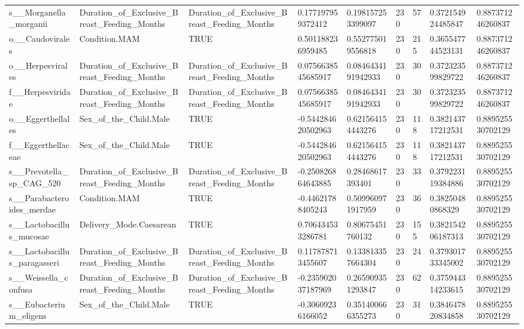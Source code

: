 \begin{longtable}{lllllllll}
s\_\_Morganella\_morganii & Duration\_of\_Exclusive\_Breast\_Feeding\_Months & Duration\_of\_Exclusive\_Breast\_Feeding\_Months & 0.177197959372412 & 0.198157253399097 & 230 & 57 & 0.372154924485847 & 0.887371246260837 \\
o\_\_Caudovirales & Condition.MAM & TRUE & 0.501188236959485 & 0.552775019556818 & 230 & 215 & 0.365547744523131 & 0.887371246260837 \\
o\_\_Herpesvirales & Duration\_of\_Exclusive\_Breast\_Feeding\_Months & Duration\_of\_Exclusive\_Breast\_Feeding\_Months & 0.0756638545685917 & 0.0846434191942933 & 230 & 30 & 0.372323599829722 & 0.887371246260837 \\
f\_\_Herpesviridae & Duration\_of\_Exclusive\_Breast\_Feeding\_Months & Duration\_of\_Exclusive\_Breast\_Feeding\_Months & 0.0756638545685917 & 0.0846434191942933 & 230 & 30 & 0.372323599829722 & 0.887371246260837 \\
o\_\_Eggerthellales & Sex\_of\_the\_Child.Male & TRUE & -0.544284620502963 & 0.621564154443276 & 230 & 118 & 0.382143717212531 & 0.889525530702129 \\
f\_\_Eggerthellaceae & Sex\_of\_the\_Child.Male & TRUE & -0.544284620502963 & 0.621564154443276 & 230 & 118 & 0.382143717212531 & 0.889525530702129 \\
s\_\_Prevotella\_sp\_CAG\_520 & Duration\_of\_Exclusive\_Breast\_Feeding\_Months & Duration\_of\_Exclusive\_Breast\_Feeding\_Months & -0.250826864643885 & 0.28468617393401 & 230 & 33 & 0.379223119384886 & 0.889525530702129 \\
s\_\_Parabacteroides\_merdae & Condition.MAM & TRUE & -0.44621788405243 & 0.509960971917959 & 230 & 36 & 0.38250480868329 & 0.889525530702129 \\
s\_\_Lactobacillus\_mucosae & Delivery\_Mode.Caesarean & TRUE & 0.706434533286781 & 0.80675451760132 & 230 & 155 & 0.382154206187313 & 0.889525530702129 \\
s\_\_Lactobacillus\_paragasseri & Duration\_of\_Exclusive\_Breast\_Feeding\_Months & Duration\_of\_Exclusive\_Breast\_Feeding\_Months & 0.117878713455607 & 0.133813357664304 & 230 & 24 & 0.379301733345002 & 0.889525530702129 \\
s\_\_Weissella\_confusa & Duration\_of\_Exclusive\_Breast\_Feeding\_Months & Duration\_of\_Exclusive\_Breast\_Feeding\_Months & -0.235902037187969 & 0.265909351293847 & 230 & 62 & 0.375944314233615 & 0.889525530702129 \\
s\_\_Eubacterium\_eligens & Sex\_of\_the\_Child.Male & TRUE & -0.30609236166052 & 0.351400666355273 & 230 & 31 & 0.384647820834858 & 0.889525530702129 \\

\end{longtable}
